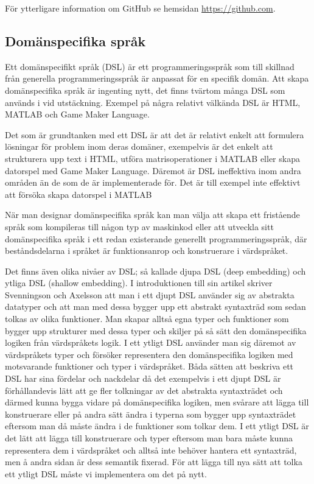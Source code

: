 \documentclass[]{article}
\begin{document}
För ytterligare information om GitHub se hemsidan \url{https://github.com}.

\subsection{Domänspecifika språk}
Ett domänspecifikt språk (\gls{DSL}) är ett programmeringsspråk som
till skillnad från generella programmeringsspråk är anpassat för en
specifik domän. Att skapa domänspecifika språk är ingenting nytt, det 
finns tvärtom många DSL som används i vid utstäckning.
Exempel på några relativt välkända DSL är HTML, MATLAB och Game Maker
Language.

Det som är grundtanken med ett DSL är att det är relativt enkelt att
formulera lösningar för problem inom deras domäner, exempelvis är det
enkelt att strukturera upp text i HTML, utföra matrisoperationer i
MATLAB eller skapa datorspel med Game Maker Language. Däremot är DSL
ineffektiva inom andra områden än de som de är implementerade för.
Det är till exempel inte effektivt att försöka skapa datorspel i
MATLAB

När man designar domänspecifika språk kan man välja att skapa ett
fristående språk som kompileras till någon typ av maskinkod eller att
utveckla sitt domänspecifika språk i ett redan existerande generellt
programmeringsspråk, där beståndsdelarna i språket är funktionsanrop
och konstruerare i värdspråket.

Det finns även olika nivåer av DSL; så kallade djupa DSL (deep
embedding) och ytliga DSL (shallow embedding). I introduktionen till
sin artikel skriver Svenningson och Axelsson \cite{Svenningsson2013}
att man i ett djupt DSL använder sig av abstrakta datatyper och att
man med dessa bygger upp ett abstrakt syntaxträd som sedan tolkas av
olika funktioner. Man skapar alltså egna typer och funktioner som
bygger upp strukturer med dessa typer och skiljer på så sätt den
domänspecifika logiken från värdspråkets logik. I ett ytligt DSL
använder man sig däremot av värdspråkets typer och försöker
representera den domänspecifika logiken med motsvarande funktioner och
typer i värdspråket. Båda sätten att beskriva %
ett DSL har sina fördelar
och nackdelar då det exempelvis i ett djupt DSL är förhållandevis lätt
att ge fler tolkningar av det abstrakta syntaxträdet och därmed kunna
bygga vidare på domänspecifika logiken, men svårare att lägga till
konstruerare eller på andra sätt ändra i typerna som bygger upp
syntaxträdet eftersom man då måste ändra i de funktioner som tolkar
dem. I ett ytligt DSL är det lätt att lägga till konstruerare och
typer eftersom man bara måste kunna representera dem i värdspråket
och alltså inte behöver hantera ett syntaxträd, men å andra sidan är
dess semantik fixerad. För att lägga till nya sätt att tolka ett
ytligt DSL måste vi implementera om det på nytt. 
\end{document}
